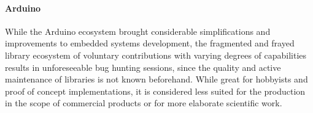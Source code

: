 \paragraph{Arduino}

While the Arduino ecosystem brought considerable simplifications and improvements to embedded systems development, the fragmented and frayed library ecosystem of voluntary contributions with varying degrees of capabilities results in unforeseeable bug hunting sessions, since the quality and active maintenance of libraries is not known beforehand. While great for hobbyists and proof of concept implementations, it is considered less suited for the production in the scope of commercial products or for more elaborate scientific work.

